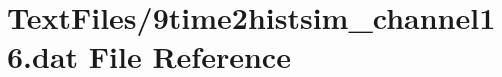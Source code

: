 \hypertarget{9time2histsim__channel16_8dat}{}\section{Text\+Files/9time2histsim\+\_\+channel16.dat File Reference}
\label{9time2histsim__channel16_8dat}
